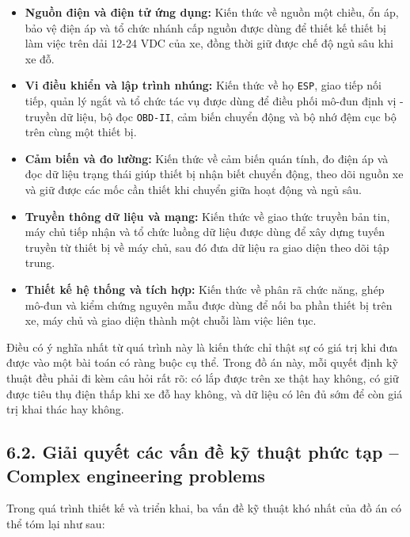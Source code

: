 \documentclass[a4paper]{extarticle}
\providecommand{\tightlist}{%
  \setlength{\itemsep}{0pt}\setlength{\parskip}{0pt}}
\begin{document}
\begin{itemize}
\tightlist
\item
  \textbf{Nguồn điện và điện tử ứng dụng:} Kiến thức về nguồn một chiều, ổn áp, bảo vệ điện áp và tổ chức nhánh cấp nguồn được dùng để thiết kế thiết bị làm việc trên dải 12-24 VDC của xe, đồng thời giữ được chế độ ngủ sâu khi xe đỗ.
\item
  \textbf{Vi điều khiển và lập trình nhúng:} Kiến thức về họ \texttt{ESP}, giao tiếp nối tiếp, quản lý ngắt và tổ chức tác vụ được dùng để điều phối mô-đun định vị - truyền dữ liệu, bộ đọc \texttt{OBD-II}, cảm biến chuyển động và bộ nhớ đệm cục bộ trên cùng một thiết bị.
\item
  \textbf{Cảm biến và đo lường:} Kiến thức về cảm biến quán tính, đo điện áp và đọc dữ liệu trạng thái giúp thiết bị nhận biết chuyển động, theo dõi nguồn xe và giữ được các mốc cần thiết khi chuyển giữa hoạt động và ngủ sâu.
\item
  \textbf{Truyền thông dữ liệu và mạng:} Kiến thức về giao thức truyền bản tin, máy chủ tiếp nhận và tổ chức luồng dữ liệu được dùng để xây dựng tuyến truyền từ thiết bị về máy chủ, sau đó đưa dữ liệu ra giao diện theo dõi tập trung.
\item
  \textbf{Thiết kế hệ thống và tích hợp:} Kiến thức về phân rã chức năng, ghép mô-đun và kiểm chứng nguyên mẫu được dùng để nối ba phần thiết bị trên xe, máy chủ và giao diện thành một chuỗi làm việc liên tục.
\end{itemize}

Điều có ý nghĩa nhất từ quá trình này là kiến thức chỉ thật sự có giá trị khi đưa được vào một bài toán có ràng buộc cụ thể. Trong đồ án này, mỗi quyết định kỹ thuật đều phải đi kèm câu hỏi rất rõ: có lắp được trên xe thật hay không, có giữ được tiêu thụ điện thấp khi xe đỗ hay không, và dữ liệu có lên đủ sớm để còn giá trị khai thác hay không.

\subsection{6.2. Giải quyết các vấn đề kỹ thuật phức tạp -- Complex engineering problems}\label{giux1ea3i-quyux1ebft-cuxe1c-vux1ea5n-ux111ux1ec1-kux1ef9-thuux1eadt-phux1ee9c-tux1ea1p-complex-engineering-problems}

Trong quá trình thiết kế và triển khai, ba vấn đề kỹ thuật khó nhất của đồ án có thể tóm lại như sau:
\end{document}
